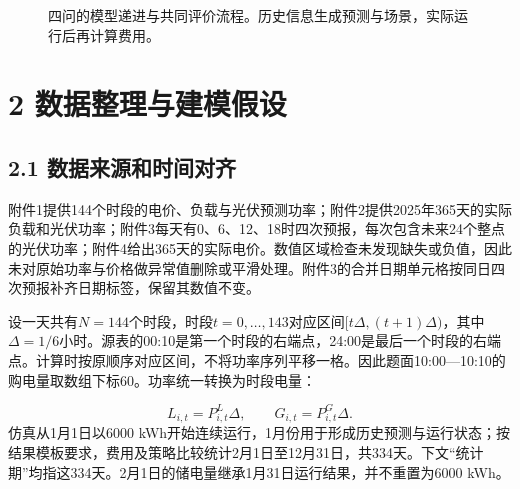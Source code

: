 \documentclass[UTF8,a4paper,zihao=-4,fontset=windows]{ctexart}
\begin{document}
\begin{figure}[H]\centering
{}
\caption{四问的模型递进与共同评价流程。历史信息生成预测与场景，实际运行后再计算费用。}
\end{figure}
\section{2 数据整理与建模假设}
\subsection{2.1 数据来源和时间对齐}
附件1提供144个时段的电价、负载与光伏预测功率；附件2提供2025年365天的实际负载和光伏功率；附件3每天有0、6、12、18时四次预报，每次包含未来24个整点的光伏功率；附件4给出365天的实际电价。数值区域检查未发现缺失或负值，因此未对原始功率与价格做异常值删除或平滑处理。附件3的合并日期单元格按同日四次预报补齐日期标签，保留其数值不变。
\par
设一天共有$N=144$个时段，时段$t=0,\ldots,143$对应区间$[t\Delta,(t+1)\Delta)$，其中$\Delta=1/6$小时。源表的00:10是第一个时段的右端点，24:00是最后一个时段的右端点。计算时按原顺序对应区间，不将功率序列平移一格。因此题面10:00—10:10的购电量取数组下标60。功率统一转换为时段电量：
\par
\begin{equation}
L_{i,t}=P^L_{i,t}\Delta,\qquad G_{i,t}=P^G_{i,t}\Delta. \tag{1}
\end{equation}
仿真从1月1日以6000 kWh开始连续运行，1月份用于形成历史预测与运行状态；按结果模板要求，费用及策略比较统计2月1日至12月31日，共334天。下文“统计期”均指这334天。2月1日的储电量继承1月31日运行结果，并不重置为6000 kWh。
\par
\end{document}
